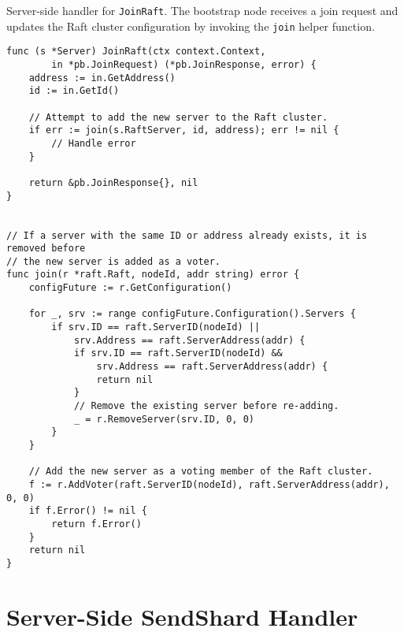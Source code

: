 \begin{listing}[H]
\caption{Server-side handler for \texttt{JoinRaft}. The bootstrap node receives a join request and updates the Raft cluster configuration by invoking the \texttt{join} helper function.}
\begin{verbatim}
func (s *Server) JoinRaft(ctx context.Context,
        in *pb.JoinRequest) (*pb.JoinResponse, error) {
    address := in.GetAddress()
    id := in.GetId()

    // Attempt to add the new server to the Raft cluster.
    if err := join(s.RaftServer, id, address); err != nil {
        // Handle error
    }

    return &pb.JoinResponse{}, nil
}


// If a server with the same ID or address already exists, it is removed before
// the new server is added as a voter.
func join(r *raft.Raft, nodeId, addr string) error {
    configFuture := r.GetConfiguration()

    for _, srv := range configFuture.Configuration().Servers {
        if srv.ID == raft.ServerID(nodeId) ||
            srv.Address == raft.ServerAddress(addr) {
            if srv.ID == raft.ServerID(nodeId) &&
                srv.Address == raft.ServerAddress(addr) {
                return nil
            }
            // Remove the existing server before re-adding.
            _ = r.RemoveServer(srv.ID, 0, 0)
        }
    }

    // Add the new server as a voting member of the Raft cluster.
    f := r.AddVoter(raft.ServerID(nodeId), raft.ServerAddress(addr), 0, 0)
    if f.Error() != nil {
        return f.Error()
    }
    return nil
}
\end{verbatim}
\end{listing}

\section{Server-Side SendShard Handler} \label{code:send-shard-server}

